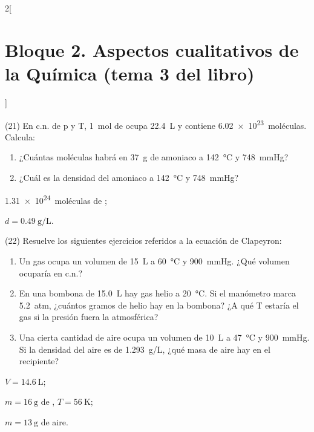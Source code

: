 \documentclass[10pt]{article}
\begin{document}
\begin{multicols}{2}[
    \section{Bloque 2. Aspectos cualitativos de la Química (tema 3 del libro)}
  ]
\begin{exercise}[
    tags    = {},
    topics  = {química,química básica},
    source  = {FQ 1B MGH 2016, p84, e21},
  ]
  (21) En c.n. de p y T, \SI{1}{mol} de  ocupa \SI{22.4}{\liter} y contiene \SI{6.02e23}{moléculas}. Calcula:
  \begin{enumerate}
    \item ¿Cuántas moléculas habrá en \SI{37}{\gram} de amoniaco a \SI{142}{\celsius} y \SI{748}{\mmHg}?
    \item ¿Cuál es la densidad del amoniaco a \SI{142}{\celsius} y \SI{748}{\mmHg}?
  \end{enumerate}
\end{exercise}

\begin{solution}
  \begin{enumerate*}
    \item \SI{1.31e24}{moléculas} de ; \item \( d = \SI{0.49}{\gram\per\liter} \).
  \end{enumerate*}
\end{solution}




\begin{exercise}[
    tags    = {},
    topics  = {química,química básica},
    source  = {FQ 1B MGH 2016, p84, e22},
  ]
  (22) Resuelve los siguientes ejercicios referidos a la ecuación de Clapeyron:
  \begin{enumerate}
    \item Un gas ocupa un volumen de \SI{15}{\liter} a \SI{60}{\celsius} y \SI{900}{\mmHg}. ¿Qué volumen ocuparía en c.n.?
    \item En una bombona de \SI{15.0}{\liter} hay gas helio a \SI{20}{\celsius}. Si el manómetro marca \SI{5.2}{atm}, ¿cuántos gramos de helio hay en la bombona? ¿A qué T estaría el gas si la presión fuera la atmosférica?
    \item Una cierta cantidad de aire ocupa un volumen de \SI{10}{\liter} a \SI{47}{\celsius} y \SI{900}{\mmHg}. Si la densidad del aire es de \SI{1.293}{g/L}, ¿qué masa de aire hay en el recipiente?
  \end{enumerate}
\end{exercise}

\begin{solution}
  \begin{enumerate*}
    \item \( V = \SI{14.6}{\liter} \); \item \( m = \SI{16}{\gram} \) de , \( T = \SI{56}{\kelvin} \); \item \( m = \SI{13}{\gram} \) de aire.
  \end{enumerate*}
\end{solution}







\end{multicols}
\end{document}
